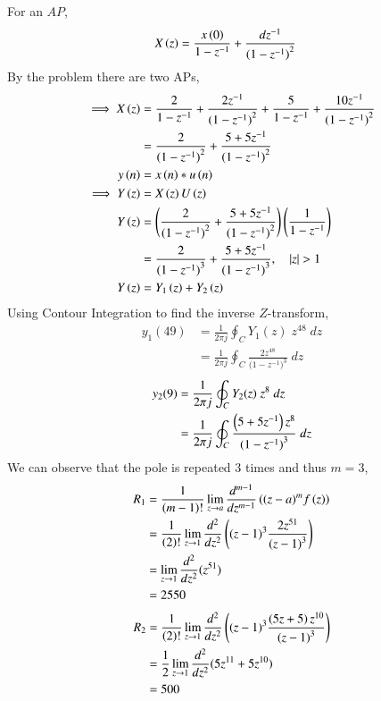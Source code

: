 \documentclass[journal,12pt,twocolumn]{IEEEtran}
\begin{document}
	For an $AP$,
	\begin{align}
		X\left(z\right) &= \frac{ x\left(0\right) }{1-z^{-1}} + \frac{dz^{-1}}{{(1-z^{-1})}^{2}} 
    \end{align}
    By the problem there are two APs,
    \begin{align}
		\implies X\left(z\right) &= \frac{2}{1-z^{-1}} + \frac{2z^{-1}}{{(1-z^{-1})}^{2}}
		+ \frac{5}{1-z^{-1}} + \frac{10z^{-1}}{{(1-z^{-1})}^{2}} \\
		&= \frac{2}{({1-z^{-1})}^{2}} + \frac{5+5z^{-1}}{({1-z^{-1})}^{2}}\\
		y\left(n\right)&=x\left(n\right)\ast u\left(n\right) \\
		\implies Y\left(z\right)&=X\left(z\right)U\left(z\right) \\
		Y\left(z\right)&=\left(\frac{2}{({1-z^{-1})}^{2}} + \frac{5+5z^{-1}}{({1-z^{-1})}^{2}}\right)\left(\frac{1}{1-z^{-1}}\right)\\
		&= \frac{2}{({1-z^{-1})}^{3}} + \frac{5+5z^{-1}}{({1-z^{-1})}^{3}},  \quad \left\vert z\right\vert>1\\
		Y\left(z\right)&= Y_1\left(z\right) + Y_2\left(z\right) 
	\end{align}
	Using Contour Integration to find the inverse $Z$-transform,
	\begin{align}
		y_1(49)&=\frac{1}{2\pi j}\oint_{C}Y_1(z) \;z^{48} \;dz  \\
		&=\frac{1}{2\pi j}\oint_{C}\frac{2z^{48}}{({1-z^{-1})}^{3}} \;dz 
	\end{align}
	\begin{align}
		y_2(9)&=\frac{1}{2\pi j}\oint_{C}Y_2(z) \;z^{8} \;dz  \\
		&=\frac{1}{2\pi j}\oint_{C}\frac{\left(5+5z^{-1}\right)z^{8}}{({1-z^{-1})}^{3}} \;dz 
	\end{align}
	We can observe that the pole is repeated $3$ times and thus $m=3$,
	\begin{align}
		R_1&=\frac{1}{\left(m-1\right)!}\lim\limits_{z\to a}\frac{d^{m-1}}{dz^{m-1}}\left({(z-a)}^{m}f\left(z\right)\right)  \\
		&=\frac{1}{\left(2\right)!}\lim\limits_{z\to 1}\frac{d^{2}}{dz^{2}}\left({(z-1)}^{3}\frac{2z^{51}}{{(z-1)}^3}\right)   \\
		&=\lim\limits_{z\to 1}\frac{d^2}{dz^2}(z^{51})   \\
		&=2550
	\end{align}
	\begin{align}
		R_2&=\frac{1}{\left(2\right)!}\lim\limits_{z\to 1}\frac{d^{2}}{dz^{2}}\left({(z-1)}^{3}\frac{\left(5z+5\right)z^{10}}{{(z-1)}^3}\right)   \\
		&=\frac{1}{{2}}\lim\limits_{z\to 1}\frac{d^2}{dz^2}(5z^{11}+5z^{10})   \\
		&=500
	\end{align}
\end{document}
